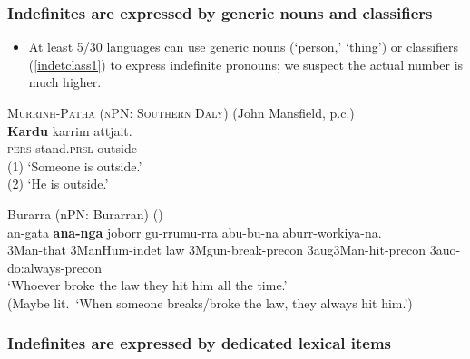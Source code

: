 \documentclass{article}
\begin{document}
\subsubsection{Indefinites are expressed by generic nouns and classifiers \label{sec:gnindf}}

\begin{itemize}
    \item At least 5/30 languages can use generic nouns (`person,' `thing') or classifiers (\ref{indetclass1}) to express indefinite pronouns; we suspect the actual number is much higher.
\end{itemize}


\begin{exe}
  \ex\label{ex:mpcli} \textsc{Murrinh-Patha (nPN: Southern Daly)} (John Mansfield, p.c.)\\
  \gll \textbf{Kardu} karrim attjait.\\
  \textsc{pers} stand.\textsc{prsl} outside\\
  \glt (1) `Someone is outside.'\\
  (2) `He is outside.'
  
  \ex \label{indetclass1} {\sc Burarra (nPN: Burarran)} (\citealt[9]{green87})\\
\gll   an-gata    \textbf{ana-nga}            joborr    gu-rrumu-rra
abu-bu-na            aburr-workiya-na. \\ 
3Man-that     3ManHum-{\sc indet}    law     3Mgun-break-{\sc precon}  3{\sc aug}3Man-hit-{\sc precon}    3{\sc auo}-do:always-{\sc precon} \\
\glt `Whoever broke the law they hit him all the  time.'\\
(Maybe lit.\ `When someone breaks/broke the law, they always hit him.')

  
\end{exe}


\subsubsection{Indefinites are expressed by dedicated lexical items
\label{sec:dili}}
\end{document}
